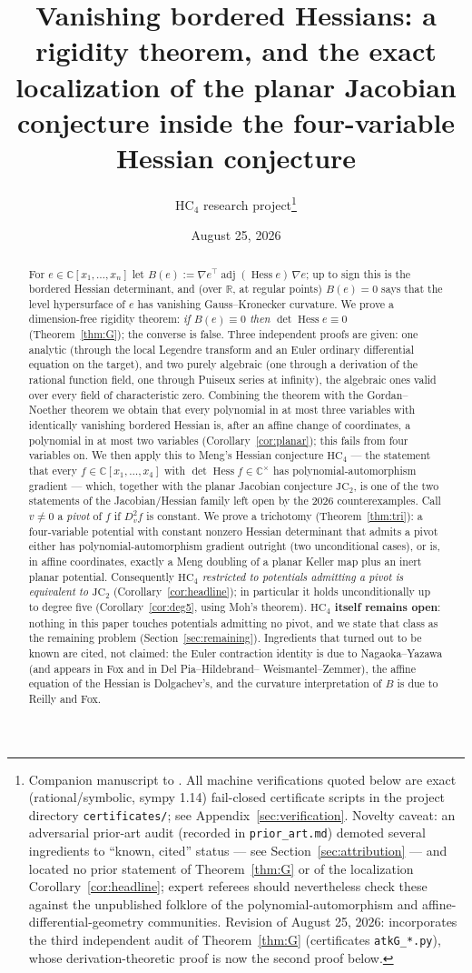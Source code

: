 \documentclass[11pt]{article}
\title{Vanishing bordered Hessians: a rigidity theorem, and the exact
localization of the planar Jacobian conjecture inside the four-variable
Hessian conjecture}
\author{HC$_4$ research project\thanks{Companion manuscript to
\cite{companion}. All machine verifications quoted below are exact
(rational/symbolic, sympy 1.14) fail-closed certificate scripts in the
project directory \texttt{certificates/}; see
Appendix~\ref{sec:verification}. Novelty caveat: an adversarial prior-art
audit (recorded in \texttt{prior\_art.md}) demoted several ingredients to
``known, cited'' status --- see Section~\ref{sec:attribution} --- and
located no prior statement of Theorem~\ref{thm:G} or of the localization
Corollary~\ref{cor:headline}; expert referees should nevertheless check
these against the unpublished folklore of the polynomial-automorphism and
affine-differential-geometry communities. Revision of August 25, 2026:
incorporates the third independent audit of Theorem~\ref{thm:G}
(certificates \texttt{atkG\_*.py}), whose derivation-theoretic proof is
now the second proof below.}}
\date{August 25, 2026}
\theoremstyle{plain}
\theoremstyle{definition}
\newcommand{\C}{\mathbb{C}}
\newcommand{\R}{\mathbb{R}}
\newcommand{\Hess}{\operatorname{Hess}}
\newcommand{\adj}{\operatorname{adj}}
\newcommand{\HC}{\mathrm{HC}}
\newcommand{\JC}{\mathrm{JC}}
\begin{document}
\maketitle

\begin{abstract}
For $e\in\C[x_1,\dots,x_n]$ let
$B(e):=\nabla e^{\top}\adj(\Hess e)\,\nabla e$; up to sign this is the
bordered Hessian determinant, and (over $\R$, at regular points)
$B(e)=0$ says that the level hypersurface of $e$ has vanishing
Gauss--Kronecker curvature. We prove a dimension-free rigidity theorem:
\emph{if $B(e)\equiv0$ then $\det\Hess e\equiv0$}
(Theorem~\ref{thm:G}); the converse is false. Three independent proofs
are given: one analytic (through the local Legendre transform and an Euler
ordinary differential equation on the target), and two purely algebraic
(one through a derivation of the rational function field, one through
Puiseux series at infinity), the algebraic ones valid over every field of
characteristic zero. Combining the theorem with the Gordan--Noether
theorem we obtain that every polynomial in at most three variables with
identically vanishing bordered Hessian is, after an affine change of
coordinates, a polynomial in at most two variables
(Corollary~\ref{cor:planar}); this fails from four variables on. We then
apply this to Meng's Hessian conjecture $\HC_4$ --- the statement that
every $f\in\C[x_1,\dots,x_4]$ with $\det\Hess f\in\C^{\times}$ has
polynomial-automorphism gradient --- which, together with the planar
Jacobian conjecture $\JC_2$, is one of the two statements of the
Jacobian/Hessian family left open by the 2026 counterexamples. Call
$v\neq0$ a \emph{pivot} of $f$ if $D_v^2f$ is constant. We prove a
trichotomy (Theorem~\ref{thm:tri}): a four-variable potential with
constant nonzero Hessian determinant that admits a pivot either has
polynomial-automorphism gradient outright (two unconditional cases), or
is, in affine coordinates, exactly a Meng doubling of a planar Keller map
plus an inert planar potential. Consequently \emph{$\HC_4$ restricted to
potentials admitting a pivot is equivalent to $\JC_2$}
(Corollary~\ref{cor:headline}); in particular it holds unconditionally up
to degree five (Corollary~\ref{cor:deg5}, using Moh's theorem).
\textbf{$\HC_4$ itself remains open}: nothing in this paper touches
potentials admitting no pivot, and we state that class as the remaining
problem (Section~\ref{sec:remaining}). Ingredients that turned out to be
known are cited, not claimed: the Euler contraction identity is due to
Nagaoka--Yazawa (and appears in Fox and in Del Pia--Hildebrand--%
Weismantel--Zemmer), the affine equation of the Hessian is Dolgachev's,
and the curvature interpretation of $B$ is due to Reilly and Fox.
\end{abstract}
\end{document}
